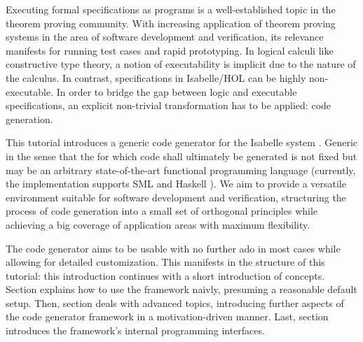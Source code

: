 %
\begin{isabellebody}%
\def\isabellecontext{Codegen}%
%
\isadelimtheory
\isanewline
\isanewline
%
\endisadelimtheory
%
\isatagtheory
%
\endisatagtheory
{\isafoldtheory}%
%
\isadelimtheory
%
\endisadelimtheory
%
\isadelimML
%
\endisadelimML
%
\isatagML
%
\endisatagML
{\isafoldML}%
%
\isadelimML
%
\endisadelimML
%
\isamarkuptrue%
%
\isamarkuptrue%
%
\isamarkuptrue%
%
\begin{isamarkuptext}%
Executing formal specifications as programs is a well-established
  topic in the theorem proving community.  With increasing
  application of theorem proving systems in the area of
  software development and verification, its relevance manifests
  for running test cases and rapid prototyping.  In logical
  calculi like constructive type theory,
  a notion of executability is implicit due to the nature
  of the calculus.  In contrast, specifications in Isabelle/HOL
  can be highly non-executable.  In order to bridge
  the gap between logic and executable specifications,
  an explicit non-trivial transformation has to be applied:
  code generation.

  This tutorial introduces a generic code generator for the
  Isabelle system \cite{isa-tutorial}.
  Generic in the sense that the
   for which code shall ultimately be
  generated is not fixed but may be an arbitrary state-of-the-art
  functional programming language (currently, the implementation
  supports SML \cite{web:sml} and Haskell \cite{web:haskell}).
  We aim to provide a
  versatile environment
  suitable for software development and verification,
  structuring the process
  of code generation into a small set of orthogonal principles
  while achieving a big coverage of application areas
  with maximum flexibility.%
\end{isamarkuptext}%
\isamarkuptrue%
%
\isamarkuptrue%
%
\begin{isamarkuptext}%
The code generator aims to be usable with no further ado
  in most cases while allowing for detailed customization.
  This manifests in the structure of this tutorial: this introduction
  continues with a short introduction of concepts.  Section
   explains how to use the framework naivly,
  presuming a reasonable default setup.  Then, section
   deals with advanced topics,
  introducing further aspects of the code generator framework
  in a motivation-driven manner.  Last, section 
  introduces the framework's internal programming interfaces.


\end{isamarkuptext}
\end{isabellebody}
